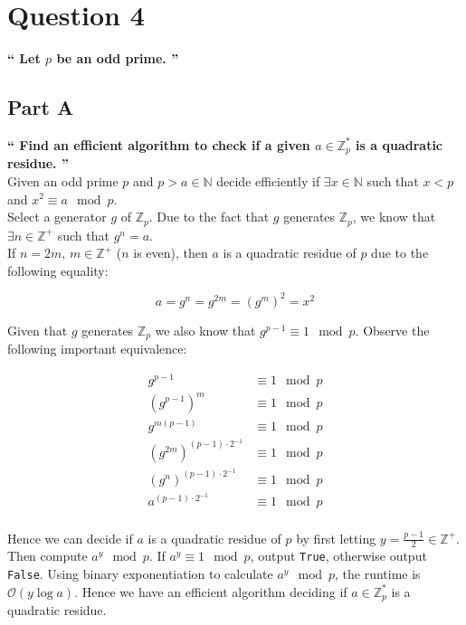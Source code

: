 \documentclass{article}
\newcommand{\HomeworkText}[1]{\textbf{``#1''}\\}
\begin{document}
	\clearpage
	\section*{Question 4}
	\HomeworkText{
		Let $p$ be an odd prime.
	}
	\subsection*{Part A}
	\HomeworkText{
		Find an efficient algorithm to check if a given $a \in \mathbb{Z}^{*}_{p}$ is a quadratic residue.
	}

	Given an odd prime $p$ and $p > a \in \mathbb{N}$ decide efficiently if $\exists x \in  \mathbb{N}$ such that $x < p$ and $x^2 \equiv a \mod p$.\\
	
	Select a generator $g$ of $\mathbb{Z}_p$.
	Due to the fact that $g$ generates $\mathbb{Z}_p$, we know that $\exists n \in \mathbb{Z}^{+}$ such that $g^n = a$. \\
	If $n = 2m,\, m \in \mathbb{Z}^{+}$ ($n$ is even), then $a$ is a quadratic residue of $p$ due to the following equality:
	
	$$a = g^{n} = g^{2m} = (g^m)^2 = x^2$$
	
	Given that $g$ generates $\mathbb{Z}_p$ we also know that $g^{p-1} \equiv 1 \mod p$. Observe the following important equivalence:
	
	\begin{equation}
	\begin{split}
	g^{p-1} & \equiv 1 \mod p\\
	(g^{p-1})^m & \equiv 1 \mod p\\
	g^{m(p-1)} & \equiv 1 \mod p\\
	(g^{2m})^{(p-1)\cdot2^{-1}} & \equiv 1 \mod p\\
	(g^n)^{(p-1)\cdot2^{-1}} & \equiv 1 \mod p\\
	a^{(p-1)\cdot2^{-1}} & \equiv 1 \mod p\\
	\end{split}
	\end{equation}
	
	Hence we can decide if $a$ is a quadratic residue of $p$ by first letting $y = \frac{p-1}{2} \in \mathbb{Z}^{+}$. Then compute $a^y \mod p$. If $a^y \equiv 1 \mod p$, output \texttt{True}, otherwise output \texttt{False}. Using binary exponentiation to calculate $a^y \mod p$, the runtime is $\mathcal{O}(y\log a)$. Hence we have an efficient algorithm deciding if $a \in \mathbb{Z}_p^*$ is a quadratic residue.
\end{document}
